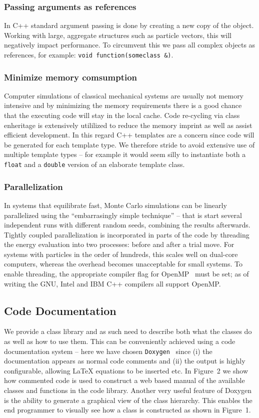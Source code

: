\documentclass[10pt]{bmc_article}
\newenvironment{bmcformat}{\begin{raggedright}\baselineskip20pt\sloppy\setboolean{publ}{false}}{\end{raggedright}\baselineskip20pt\sloppy}
\begin{document}
\begin{bmcformat}
\subsubsection*{Passing arguments as references}
In C++ standard argument passing is done by creating a new copy of the object.
Working with large, aggregate structures such as particle vectors, this will negatively impact performance. To circumvent this we pass all complex objects as references, for example: \verb"void function(someclass &)".

\subsubsection*{Minimize memory comsumption}
Computer simulations of classical mechanical systems are usually not memory intensive and by minimizing the memory requirements there is a good chance that the executing code will stay in the local cache.
Code re-cycling via class enheritage is extensively utililized to reduce the memory imprint as well as assist efficient development.
In this regard C++ templates are a concern since code will be generated for each template type.
We therefore stride to avoid extensive use of multiple template types -- for example it would seem silly to instantiate both a \verb"float" and a \verb"double" version of an elaborate template class.

\subsubsection*{Parallelization}
In systems that equilibrate fast, Monte Carlo simulations can be linearly parallelized using the ``embarrasingly simple technique'' -- that is start several independent runs with different random seeds, combining the results afterwards.
Tightly coupled parallelization is incorporated in parts of the code by threading the energy evaluation into two processes: before and after a trial move.
For systems with particles in the order of hundreds, this scales well on dual-core computers, whereas the overhead becomes unacceptable for small systems.
To enable threading, the appropriate compiler flag for OpenMP~\cite{openmp:98} must be set; as of writing the GNU, Intel and IBM C++ compilers all support OpenMP.

\subsection*{Code Documentation}
We provide a class library and as such need to describe both what the classes do as well as how to use them.
This can be conveniently achieved using a code documentation system -- here we have chosen \verb"Doxygen"~\cite{doxygen} since
(i) the documentation appears as normal code comments and
(ii) the output is highly configurable, allowing LaTeX equations to be inserted etc.
In Figure~2 we show how commented code is used to construct a web based manual of the available
classes and functions in the code library.
Another very useful feature of Doxygen is the ability to generate a graphical view of the class hierarchy.
This enables the end programmer to visually see how a class is constructed as shown in Figure~1.


\end{bmcformat}
\end{document}
